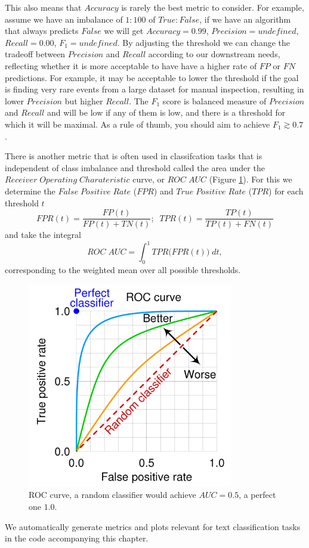 This also means that $Accuracy$ is rarely the best metric to consider.
For example, assume we have an imbalance of $1 : 100$ of $True : False$, if we have an algorithm that always predicts $False$ we will get $Accuracy = 0.99$, $Precision = undefined$, $Recall = 0.00$, $F_1 = undefined$.
By adjusting the threshold we can change the tradeoff between $Precision$ and $Recall$ according to our downstream needs, reflecting whether it is more acceptable to have have a higher rate of $FP$ or $FN$ predictions.
For example, it may be acceptable to lower the threshold if the goal is finding very rare events from a large dataset for manual inspection, resulting in lower $Precision$ but higher $Recall$.
The $F_1$ score is balanced measure of $Precision$ and $Recall$ and will be low if any of them is low, and there is a threshold for which it will be maximal.
As a rule of thumb, you should aim to achieve $F_1 \gtrsim 0.7$.

There is another metric that is often used in classifcation tasks that is independent of class imbalance and threshold called the area under the $Receiver\; Operating\; Charateristic$ curve, or $ROC\; AUC$ (Figure \ref{fig:roc_curve}).
For this we determine the $False\; Positive\; Rate$ ($FPR$) and $True\; Positive\; Rate$ ($TPR$) for each threshold $t$
\begin{equation}
    FPR(t) = \frac{FP(t)}{FP(t) + TN(t)}; \;\;
    TPR(t) = \frac{TP(t)}{TP(t) + FN(t)}
\end{equation}
and take the integral
\begin{equation}
    ROC\; AUC = \int_0^1 TPR\bigl(FPR(t)\bigr)\; dt,
\end{equation}
corresponding to the weighted mean over all possible thresholds.
\begin{figure}[h]
    \centering
    \includegraphics[width=0.8\textwidth]{chapters/NLP/figures/Roc_curve.svg.png}
    \caption{ROC curve, a random classifier would achieve $AUC = 0.5$, a perfect one $1.0$.}
    \label{fig:roc_curve}
\end{figure}
We automatically generate metrics and plots relevant for text classification tasks in the code accompanying this chapter.
